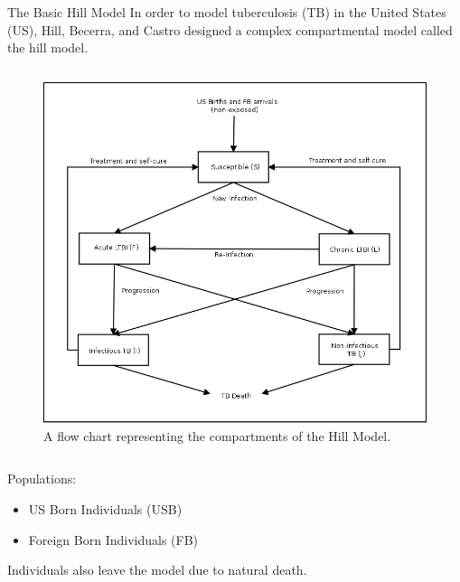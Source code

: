 \documentclass[final]{beamer}
\begin{document}
\begin{frame}
\begin{columns}
\begin{column}{.3\textwidth}
      \begin{block}{The Basic Hill Model}
        In order to model tuberculosis (TB) in the United States (US), Hill,
        Becerra, and Castro designed a complex compartmental model called the
        hill model. 
        \vspace{-2em}
        \begin{block}{}
          \begin{column}{.6\textwidth}
            \begin{figure}[h]
              \begin{center}
                \includegraphics[scale=.5]{HillModelFlowChart}
              \end{center}
              \caption{A flow chart representing the compartments of the Hill
                       Model.}
              \label{fig:hillFlow}
            \end{figure}
          \end{column}
          \begin{column}{.33\textwidth}
            Populations:
            \begin{itemize}
              \item US Born Individuals (USB) 
              \item Foreign Born Individuals (FB)
            \end{itemize}
            Individuals also leave the model due to natural death.
          \end{column}

\end{block}
\end{block}
\end{column}
\end{columns}
\end{frame}
\end{document}
